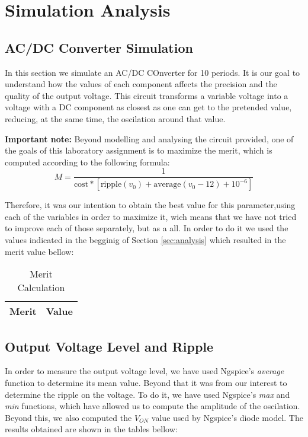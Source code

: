 \section{Simulation Analysis}
\label{sec:simulation}

\subsection{AC/DC Converter Simulation}
\label{subsec:circuit_simulation}
\par In this section we simulate an AC/DC COnverter for 10 periods. It is our goal to understand how the values of each component affects the precision and the quality of the output voltage. This circuit transforms a variable voltage into a voltage with a DC component as closest as one can get to the pretended value, reducing, at the same time, the oscilation around that value.

\par  \textbf{Important note:} Beyond modelling and analysing the circuit provided, one of the goals of this laboratory assignment is to maximize the merit, which is computed according to the following formula:
\begin{equation}
M = \frac{1}{\text{cost}*[\text{ripple}(v_0)+\text{average}(v_{0}-12)+10^{-6}]}
\end{equation}

Therefore, it was our intention to obtain the best value for this parameter,using each of the variables in order to maximize it, wich means that we have not tried to improve each of those separately, but as a all.
In order to do it we used the values indicated in the begginig of Section \ref{sec:analysis} which resulted in the merit value bellow:

\begin{table}[H]
  \centering
  \begin{tabular}{ | m{11cm} | m{3cm}| } 
    \hline    
    {\bf Merit} & {\bf Value} \\ \hline
    
  \end{tabular}
  \caption{Merit Calculation}
  \label{tab:merit}
\end{table}



\subsection{Output Voltage Level and Ripple}
\label{subsec:out_voltage}
In order to measure the output voltage level, we have used Ngspice's \textit{average} function to determine its mean value. Beyond that it was from our interest to determine the ripple on the voltage. To do it, we have used Ngspice's \textit{max} and \textit{min} functions, which have allowed us to compute the amplitude of the oscilation. Beyond this, we also computed the $V_{ON}$ value used by Ngspice's diode model. The results obtained are shown in the tables bellow:


